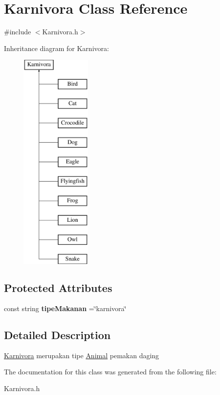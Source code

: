\hypertarget{classKarnivora}{\section{Karnivora Class Reference}
\label{classKarnivora}
}


{\ttfamily \#include $<$Karnivora.\-h$>$}

Inheritance diagram for Karnivora\-:\begin{figure}[H]
\begin{center}
\leavevmode
\includegraphics[height=11.000000cm]{classKarnivora}
\end{center}
\end{figure}
\subsection*{Protected Attributes}
\begin{DoxyCompactItemize}
\item 
\hypertarget{classKarnivora_a2f994f23bc64dd353d068b54a899b4c2}{const string {\bfseries tipe\-Makanan} =\char`\"{}karnivora\char`\"{}}\label{classKarnivora_a2f994f23bc64dd353d068b54a899b4c2}

\end{DoxyCompactItemize}


\subsection{Detailed Description}
\hyperlink{classKarnivora}{Karnivora} merupakan tipe \hyperlink{classAnimal}{Animal} pemakan daging 

The documentation for this class was generated from the following file\-:\begin{DoxyCompactItemize}
\item 
Karnivora.\-h\end{DoxyCompactItemize}
